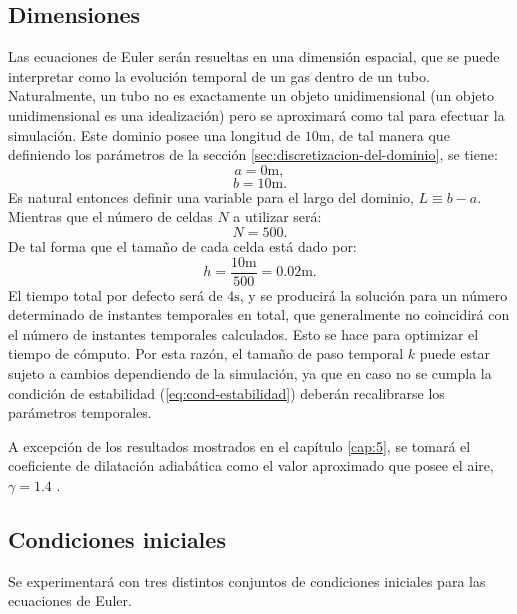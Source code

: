\subsection{Dimensiones}
\label{sec:dimensiones}
Las ecuaciones de Euler serán resueltas en una dimensión espacial, que se puede interpretar como la evolución temporal de un gas dentro de un tubo. Naturalmente, un tubo no es exactamente un objeto unidimensional (un objeto unidimensional es una idealización) pero se aproximará como tal para efectuar la simulación. Este dominio posee una longitud de $10\unit{\meter}$, de tal manera que definiendo los parámetros de la sección \ref{sec:discretizacion-del-dominio}, se tiene:
\begin{equation}
	a = 0 \unit{\meter},
\end{equation}
\begin{equation}
	b = 10 \unit{\meter}.
\end{equation}
Es natural entonces definir una variable para el largo del dominio, $L\equiv b-a$. Mientras que el número de celdas $N$ a utilizar será:
\begin{equation}
	N = 500.
\end{equation}
De tal forma que el tamaño de cada celda está dado por:
\begin{equation}
	h = \frac{10\unit{\meter}}{500} = 0.02 \unit{\meter}.
\end{equation}
El tiempo total por defecto será de $4\unit{\second}$, y se producirá la solución para un número determinado de instantes temporales en total, que generalmente no coincidirá con el número de instantes temporales calculados. Esto se hace para optimizar el tiempo de cómputo. Por esta razón, el tamaño de paso temporal $k$ puede estar sujeto a cambios dependiendo de la simulación, ya que en caso no se cumpla la condición de estabilidad (\ref{eq:cond-estabilidad}) deberán recalibrarse los parámetros temporales.

A excepción de los resultados mostrados en el capítulo \ref{cap:5}, se tomará el coeficiente de dilatación adiabática como el valor aproximado que posee el aire, $\gamma = 1.4$ \cite{LeVeque}.

\subsection{Condiciones iniciales}
Se experimentará con tres distintos conjuntos de condiciones iniciales para las ecuaciones de Euler. 

